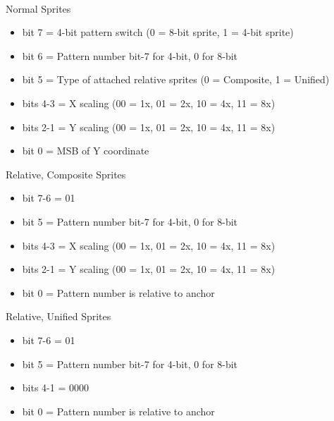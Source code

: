 \\
Normal Sprites
\begin{itemize}
\item bit 7 = 4-bit pattern switch (0 = 8-bit sprite, 1 = 4-bit sprite)
\item bit 6 = Pattern number bit-7 for 4-bit, 0 for 8-bit
\item bit 5 = Type of attached relative sprites (0 = Composite, 1 =
  Unified)
\item bits 4-3 = X scaling (00 = 1x, 01 = 2x, 10 = 4x, 11 = 8x)
\item bits 2-1 = Y scaling (00 = 1x, 01 = 2x, 10 = 4x, 11 = 8x)
\item bit 0 = MSB of Y coordinate
\end{itemize}
Relative, Composite Sprites
\begin{itemize}
\item bit 7-6 = 01
\item bit 5 = Pattern number bit-7 for 4-bit, 0 for 8-bit
\item bits 4-3 = X scaling (00 = 1x, 01 = 2x, 10 = 4x, 11 = 8x)
\item bits 2-1 = Y scaling (00 = 1x, 01 = 2x, 10 = 4x, 11 = 8x)
\item bit 0 = Pattern number is relative to anchor
\end{itemize}
Relative, Unified Sprites
\begin{itemize}
\item bit 7-6 = 01
\item bit 5 = Pattern number bit-7 for 4-bit, 0 for 8-bit
\item bits 4-1 = 0000
\item bit 0 = Pattern number is relative to anchor
\end{itemize}

